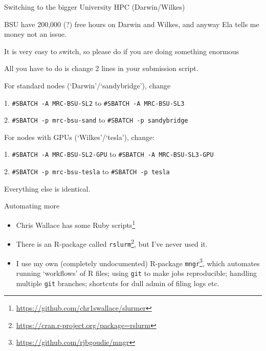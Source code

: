 \documentclass[t,10pt]{beamer}
\let\oldfootnote\footnote
\renewcommand\footnote[1][]{\oldfootnote[frame,#1]}
\begin{document}
\begin{frame}[fragile]{Switching to the bigger University HPC (Darwin/Wilkes)}

BSU have 200,000 (?) free hours on Darwin and Wilkes, and anyway Ela tells me money not an issue.

\bigskip
It is very easy to switch, so please do if you are doing something enormous

\bigskip
All you have to do is change \alert{2 lines} in your submission script.

\bigskip
For standard nodes (`Darwin'/`sandybridge'), change

1. \texttt{#SBATCH -A MRC-BSU-SL2} to
\texttt{#SBATCH -A MRC-BSU-SL3}

2. \texttt{#SBATCH -p mrc-bsu-sand} to \texttt{#SBATCH -p sandybridge}

\bigskip
For nodes with GPUs (`Wilkes'/`tesla'), change:

1. \texttt{#SBATCH -A MRC-BSU-SL2-GPU} to
\texttt{#SBATCH -A MRC-BSU-SL3-GPU}

2. \texttt{#SBATCH -p mrc-bsu-tesla} to \texttt{#SBATCH -p tesla}

\bigskip
Everything else is identical.
\end{frame}

\begin{frame}[fragile]{Automating more}

\begin{itemize}
\item Chris Wallace has some Ruby scripts\footnote{\url{https://github.com/chr1swallace/slurmer}}

\item There is an R-package called \texttt{rslurm}\footnote{\url{https://cran.r-project.org/package=rslurm}}, but I've never used it.

\item I use my own (completely undocumented) R-package \texttt{mngr}\footnote{\url{https://github.com/rjbgoudie/mngr}}, which automates running `workflows' of R files; using \verb|git| to make jobs reproducible; handling multiple \verb|git| branches; shortcuts for dull admin of filing logs etc.
\end{itemize}

\end{frame}
\end{document}
